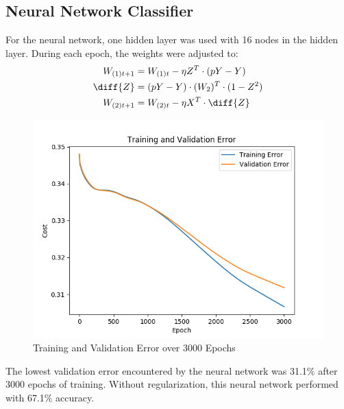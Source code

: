 \documentclass{math}
\begin{document}
\subsection*{Neural Network Classifier}
For the neural network, one hidden layer was used with 16 nodes in the hidden
layer. During each epoch, the weights were adjusted to:
\begin{align*}
  W_{(1)t+1} &= W_{(1)t}-\eta Z^T\cdot(pY-Y) \\
  \diff{Z} &= (pY-Y)\cdot (W_2)^T\cdot(1-Z^2) \\
  W_{(2)t+1} &= W_{(2)t}-\eta X^T\cdot\diff{Z}
\end{align*}
\begin{figure}[H]
  \centering
  \includegraphics[width=12cm]{assets/hw_04_nn_cost_unregularized.png}
  \caption{Training and Validation Error over 3000 Epochs}
\end{figure}
The lowest validation error encountered by the neural network was 31.1\% after
3000 epochs of training. Without regularization, this neural network performed
with 67.1\% accuracy.
\end{document}
